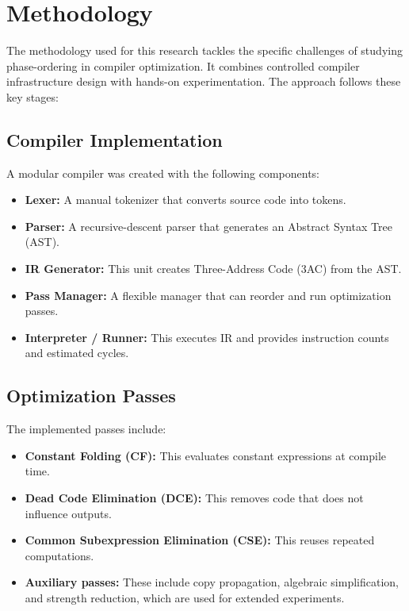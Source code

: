 \documentclass[conference]{IEEEtran}
\begin{document}
\section{Methodology}

The methodology used for this research tackles the specific challenges of studying phase-ordering in compiler optimization. It combines controlled compiler infrastructure design with hands-on experimentation. The approach follows these key stages:

\subsection{Compiler Implementation}

A modular compiler was created with the following components:

\begin{itemize}
    \item \textbf{Lexer:} A manual tokenizer that converts source code into tokens.
    \item \textbf{Parser:} A recursive-descent parser that generates an Abstract Syntax Tree (AST).
    \item \textbf{IR Generator:} This unit creates Three-Address Code (3AC) from the AST.
    \item \textbf{Pass Manager:} A flexible manager that can reorder and run optimization passes.
    \item \textbf{Interpreter / Runner:} This executes IR and provides instruction counts and estimated cycles.
\end{itemize}

\subsection{Optimization Passes}

The implemented passes include:

\begin{itemize}
    \item \textbf{Constant Folding (CF):} This evaluates constant expressions at compile time.
    \item \textbf{Dead Code Elimination (DCE):} This removes code that does not influence outputs.
    \item \textbf{Common Subexpression Elimination (CSE):} This reuses repeated computations.
    \item \textbf{Auxiliary passes:} These include copy propagation, algebraic simplification, and strength reduction, which are used for extended experiments.
\end{itemize}
\end{document}
